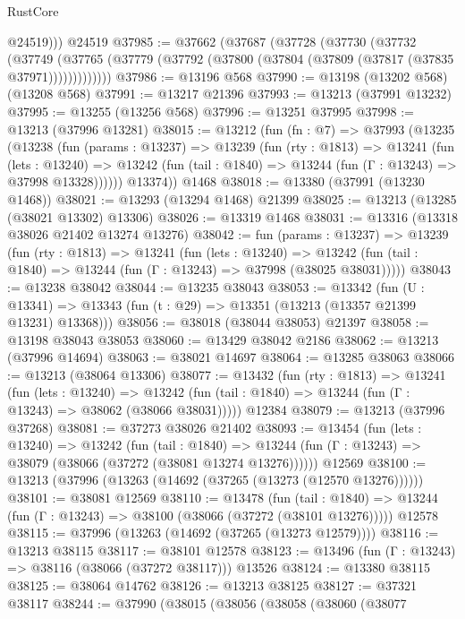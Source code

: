 \begin{lexlean}{RustCore}
\begin{coremodule}
          @24519)))
    @24519
@37985 := @37662
    (@37687
      (@37728
        (@37730
          (@37732
            (@37749
              (@37765 (@37779 (@37792 (@37800 (@37804 (@37809 (@37817 (@37835 @37971)))))))))))))
@37986 := @13196 @568
@37990 := @13198 (@13202 @568) (@13208 @568)
@37991 := @13217 @21396
@37993 := @13213 (@37991 @13232)
@37995 := @13255 (@13256 @568)
@37996 := @13251 @37995
@37998 := @13213 (@37996 @13281)
@38015 := @13212
    (fun (fn : @7) =>
    @37993
      (@13235
        (@13238
          (fun (params : @13237) =>
          @13239
            (fun (rty : @1813) =>
            @13241
              (fun (lets : @13240) =>
              @13242 (fun (tail : @1840) => @13244 (fun (Γ : @13243) => @37998 @13328))))))
        @13374))
    @1468
@38018 := @13380 (@37991 (@13230 @1468))
@38021 := @13293 (@13294 @1468) @21399
@38025 := @13213 (@13285 (@38021 @13302) @13306)
@38026 := @13319 @1468
@38031 := @13316 (@13318 @38026 @21402 @13274 @13276)
@38042 := fun (params : @13237) =>
  @13239
    (fun (rty : @1813) =>
    @13241
      (fun (lets : @13240) =>
      @13242 (fun (tail : @1840) => @13244 (fun (Γ : @13243) => @37998 (@38025 @38031)))))
@38043 := @13238 @38042
@38044 := @13235 @38043
@38053 := @13342
    (fun (U : @13341) => @13343 (fun (t : @29) => @13351 (@13213 (@13357 @21399 @13231) @13368)))
@38056 := @38018 (@38044 @38053) @21397
@38058 := @13198 @38043 @38053
@38060 := @13429 @38042 @2186
@38062 := @13213 (@37996 @14694)
@38063 := @38021 @14697
@38064 := @13285 @38063
@38066 := @13213 (@38064 @13306)
@38077 := @13432
    (fun (rty : @1813) =>
    @13241
      (fun (lets : @13240) =>
      @13242 (fun (tail : @1840) => @13244 (fun (Γ : @13243) => @38062 (@38066 @38031)))))
    @12384
@38079 := @13213 (@37996 @37268)
@38081 := @37273 @38026 @21402
@38093 := @13454
    (fun (lets : @13240) =>
    @13242
      (fun (tail : @1840) =>
      @13244 (fun (Γ : @13243) => @38079 (@38066 (@37272 (@38081 @13274 @13276))))))
    @12569
@38100 := @13213 (@37996 (@13263 (@14692 (@37265 (@13273 (@12570 @13276))))))
@38101 := @38081 @12569
@38110 := @13478
    (fun (tail : @1840) => @13244 (fun (Γ : @13243) => @38100 (@38066 (@37272 (@38101 @13276)))))
    @12578
@38115 := @37996 (@13263 (@14692 (@37265 (@13273 @12579))))
@38116 := @13213 @38115
@38117 := @38101 @12578
@38123 := @13496 (fun (Γ : @13243) => @38116 (@38066 (@37272 @38117))) @13526
@38124 := @13380 @38115
@38125 := @38064 @14762
@38126 := @13213 @38125
@38127 := @37321 @38117
@38244 := @37990
    (@38015
      (@38056
        (@38058
          (@38060
            (@38077

\end{coremodule}
\end{lexlean}
